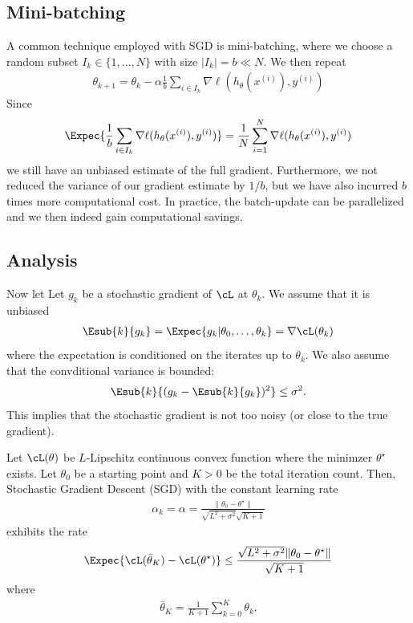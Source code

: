 \documentclass{article}
\begin{document}
\subsection{Mini-batching}
A common technique employed with SGD is mini-batching, where we choose a random subset $I_k\in\{1, \dots, N\}$ with size $|I_k|=b\ll N$.
We then repeat
\begin{align}
    \theta_{k+1} =
    \theta_k - \alpha \frac{1}{b}\sum_{i\in I_k} \nabla \ell(h_\theta(x^{(i)}), y^{(i)})
\end{align}
Since 
\begin{align}
  \Expec{  \frac{1}{b}\sum_{i\in I_k} \nabla \ell(h_\theta(x^{(i)}), y^{(i)})} = 
  \frac{1}{N}\sum_{i=1}^N \nabla \ell(h_\theta(x^{(i)}), y^{(i)})
\end{align}
we still have an unbiased estimate of the full gradient.
Furthermore, we not reduced the variance of our gradient estimate by $1/b$,
but we have also incurred $b$ times more computational cost.
In practice, the batch-update can be parallelized and we then indeed gain computational savings.

\subsection{Analysis}
Now let 
Let $g_k$ be a stochastic gradient of $\cL$ at $\theta_k$.
We assume that it is unbiased
\begin{align}
    \Esub{k}{g_k} = \Expec{g_k|\theta_0, \dots, \theta_k} = \nabla \cL(\theta_k)
\end{align}
where the expectation is conditioned on the iterates up to $\theta_k$.
We also assume that the convditional variance is bounded:
\begin{align}
    \Esub{k}{(g_k-\Esub{k}{g_k})^2} \leq \sigma^2.
\end{align}
This implies that the stochastic gradient is not too noisy (or close to the true gradient).

\begin{theorem}
    Let $\cL(\theta)$ be $L$-Lipschitz continuous convex function where the minimzer $\theta^\star$ exists.
    Let $\theta_0$ be a starting point and $K>0$ be the total iteration count.
    Then, Stochastic Gradient Descent (SGD) with the constant learning rate
    \begin{align}
        \alpha_k = \alpha = \frac{\|\theta_0 - \theta^\star\|}{\sqrt{L^2+\sigma^2}\sqrt{K+1}}
    \end{align}
    exhibits the rate
    \begin{align}
        \Expec{\cL(\bar{\theta}_K) - \cL(\theta^\star)} \leq \frac{\sqrt{L^2+\sigma^2}\|\theta_0-\theta^\star\|}{\sqrt{K+1}}
    \end{align}
    where
    \begin{align}
        \bar{\theta}_K = \frac{1}{K+1} \sum_{k=0}^K \theta_k.
    \end{align}
\end{theorem}
\end{document}
